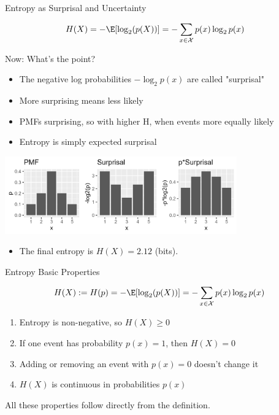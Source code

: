 \documentclass[11pt,compress,t,notes=noshow, xcolor=table]{beamer}
\begin{document}
\begin{vbframe}{Entropy as Surprisal and Uncertainty}


\begin{equation*}
\begin{aligned} 
  H(X) = - \E[\log_2(p(X))]           &= -\sum_{x \in \Xspace} p(x) \log_2 p(x) 
\end{aligned} 
\end{equation*}

Now: What's the point?
\begin{itemize}
\item The negative log probabilities $-\log_2 p(x)$ are called "surprisal"
\item More surprising means less likely
\item PMFs surprising, so with higher H, when events more equally likely
\item Entropy is simply expected surprisal
\end{itemize}


\begin{center}
\includegraphics[width = 10cm ]{figure/entropy_calc.png} 
\end{center}
\vspace{-0.5cm}
\begin{itemize}
\item The final entropy is $H(X)=2.12$ (bits).
\end{itemize}


\end{vbframe}

\begin{vbframe}{Entropy Basic Properties}

$$H(X) := H(p) = - \E[\log_2(p(X))] = -\sum_{x \in \Xspace} p(x) \log_2 p(x)$$

\vspace{0.2cm}
  \begin{enumerate}
  \setlength\itemsep{1.2em} 
    \item Entropy is non-negative, so $H(X) \geq 0$    \item If one event has probability $p(x) = 1$, then $H(X)=0$
    \item Adding or removing an event with $p(x)=0$ doesn't change it
    \item $H(X)$ is continuous in probabilities $p(x)$
  \end{enumerate}
\vspace{0.2cm}  
All these properties follow directly from the definition.


\end{vbframe}
\end{document}

